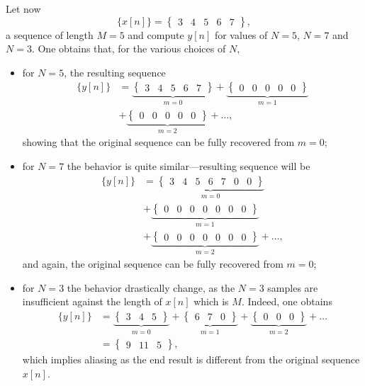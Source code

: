 \documentclass[\documentfontsize, twocolumn]{\classname}
\begin{document}
Let now
\[
    \{x[n]\} = \begin{Bmatrix} 3 & 4&  5&  6&  7\end{Bmatrix},
\]
a sequence of length $M=5$ and compute $y[n]$ for values of $N=5$, $N=7$ and $N=3$. One obtains that, for the various choices of $N$,
\begin{itemize}
    \item for $N=5$, the resulting sequence \begin{align*}\{y[n]\} &= \underbrace{\begin{Bmatrix} 3 & 4 & 5 & 6 & 7\end{Bmatrix}}_{m = 0} + \underbrace{\begin{Bmatrix} 0 & 0 & 0 & 0 & 0 \end{Bmatrix}}_{m=1}\\ &+ \underbrace{\begin{Bmatrix} 0 & 0 & 0 & 0 & 0 \end{Bmatrix}}_{m=2} +\dots,\end{align*} showing that the original sequence can be fully recovered from $m=0$;
    \item for $N=7$ the behavior is quite similar---resulting sequence will be \begin{align*}\{y[n]\} &= \underbrace{\begin{Bmatrix} 3 & 4 & 5 & 6 & 7 & 0 & 0\end{Bmatrix}}_{m = 0}\\ &+ \underbrace{\begin{Bmatrix} 0 & 0 & 0 & 0 & 0 & 0 & 0 \end{Bmatrix}}_{m=1}\\ &+ \underbrace{\begin{Bmatrix} 0 & 0 & 0 & 0 & 0 & 0 & 0 \end{Bmatrix}}_{m=2} +\dots,\end{align*} and again, the original sequence can be fully recovered from $m=0$;
    \item for $N=3$ the behavior drastically change, as the $N=3$ samples are insufficient against the length of $x[n]$ which is $M$. Indeed, one obtains \begin{align*} \{y[n]\} &= \underbrace{\begin{Bmatrix} 3 & 4 & 5\end{Bmatrix}}_{m=0} + \underbrace{\begin{Bmatrix} 6 & 7 & 0\end{Bmatrix}}_{m=1} + \underbrace{\begin{Bmatrix}0 & 0 & 0\end{Bmatrix}}_{m=2} + \dots\\ &= \begin{Bmatrix} 9 & 11 & 5 \end{Bmatrix},\end{align*} which implies aliasing as the end result is different from the original sequence $x[n]$.
\end{itemize}
\end{document}
